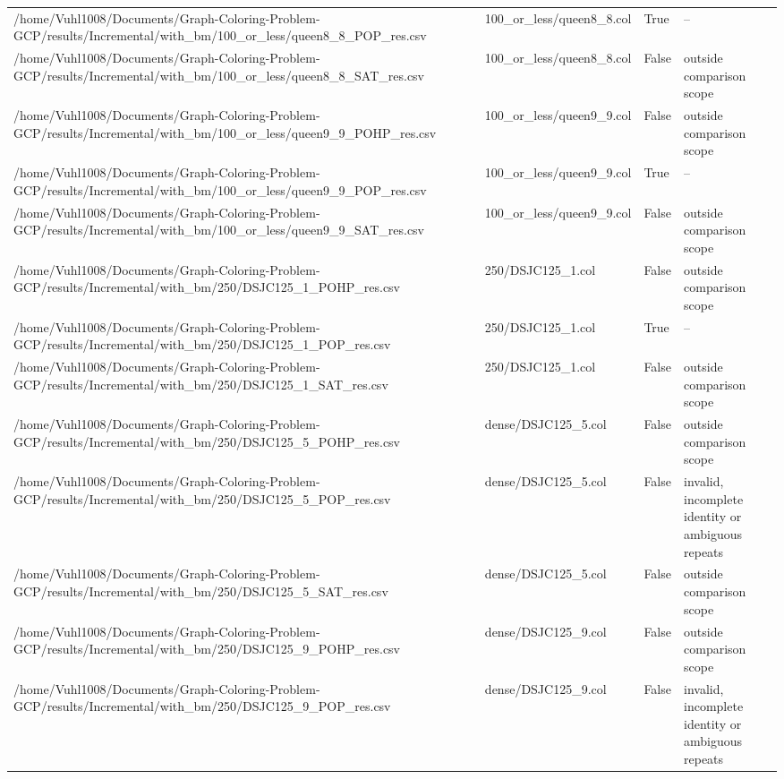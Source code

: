 \begin{table}[htbp]
\begin{tabular}{llll}
/home/Vuhl1008/Documents/Graph-Coloring-Problem-GCP/results/Incremental/with\_bm/100\_or\_less/queen8\_8\_POP\_res.csv & 100\_or\_less/queen8\_8.col & True & -- \\
/home/Vuhl1008/Documents/Graph-Coloring-Problem-GCP/results/Incremental/with\_bm/100\_or\_less/queen8\_8\_SAT\_res.csv & 100\_or\_less/queen8\_8.col & False & outside comparison scope \\
/home/Vuhl1008/Documents/Graph-Coloring-Problem-GCP/results/Incremental/with\_bm/100\_or\_less/queen9\_9\_POHP\_res.csv & 100\_or\_less/queen9\_9.col & False & outside comparison scope \\
/home/Vuhl1008/Documents/Graph-Coloring-Problem-GCP/results/Incremental/with\_bm/100\_or\_less/queen9\_9\_POP\_res.csv & 100\_or\_less/queen9\_9.col & True & -- \\
/home/Vuhl1008/Documents/Graph-Coloring-Problem-GCP/results/Incremental/with\_bm/100\_or\_less/queen9\_9\_SAT\_res.csv & 100\_or\_less/queen9\_9.col & False & outside comparison scope \\
/home/Vuhl1008/Documents/Graph-Coloring-Problem-GCP/results/Incremental/with\_bm/250/DSJC125\_1\_POHP\_res.csv & 250/DSJC125\_1.col & False & outside comparison scope \\
/home/Vuhl1008/Documents/Graph-Coloring-Problem-GCP/results/Incremental/with\_bm/250/DSJC125\_1\_POP\_res.csv & 250/DSJC125\_1.col & True & -- \\
/home/Vuhl1008/Documents/Graph-Coloring-Problem-GCP/results/Incremental/with\_bm/250/DSJC125\_1\_SAT\_res.csv & 250/DSJC125\_1.col & False & outside comparison scope \\
/home/Vuhl1008/Documents/Graph-Coloring-Problem-GCP/results/Incremental/with\_bm/250/DSJC125\_5\_POHP\_res.csv & dense/DSJC125\_5.col & False & outside comparison scope \\
/home/Vuhl1008/Documents/Graph-Coloring-Problem-GCP/results/Incremental/with\_bm/250/DSJC125\_5\_POP\_res.csv & dense/DSJC125\_5.col & False & invalid, incomplete identity or ambiguous repeats \\
/home/Vuhl1008/Documents/Graph-Coloring-Problem-GCP/results/Incremental/with\_bm/250/DSJC125\_5\_SAT\_res.csv & dense/DSJC125\_5.col & False & outside comparison scope \\
/home/Vuhl1008/Documents/Graph-Coloring-Problem-GCP/results/Incremental/with\_bm/250/DSJC125\_9\_POHP\_res.csv & dense/DSJC125\_9.col & False & outside comparison scope \\
/home/Vuhl1008/Documents/Graph-Coloring-Problem-GCP/results/Incremental/with\_bm/250/DSJC125\_9\_POP\_res.csv & dense/DSJC125\_9.col & False & invalid, incomplete identity or ambiguous repeats \\

\end{tabular}
\end{table}
